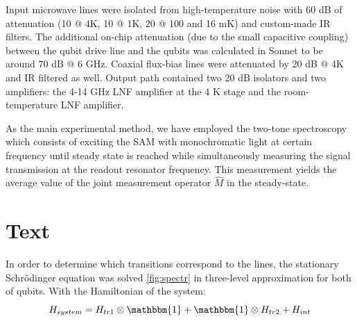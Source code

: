\documentclass[%
 aip,
 amsmath,amssymb,
 reprint,%
]{revtex4-1}
\begin{document}
Input microwave lines were isolated from high-temperature noise with 60 dB of attenuation (10 @ 4K, 10 @ 1K, 20 @ 100 and 16 mK) and custom-made IR filters. The additional on-chip attenuation (due to the small capacitive coupling) between the qubit drive line and the qubits was calculated in Sonnet to be around 70 dB @ 6 GHz. Coaxial flux-bias lines were attenuated by 20 dB @ 4K and IR filtered as well. Output path contained two 20 dB isolators and two amplifiers: the 4-14 GHz LNF amplifier at the 4 K stage and the room-temperature LNF amplifier.

As the main experimental method, we have employed the two-tone spectroscopy which consists of exciting the SAM with monochromatic light at certain frequency until steady state is reached while simultaneously measuring the signal transmission at the readout resonator frequency. This measurement yields the average value of the joint measurement operator $\hat M$ in the steady-state.

\section{Text}

In order to determine which transitions correspond to the lines, the stationary Schrödinger equation was solved \autoref{fig:spectr} in three-level approximation for both of qubits. With the Hamiltonian of the system:
\begin{equation}
	H_{system} = H_{tr1}\otimes \mathbbm{1}+\mathbbm{1}\otimes H_{tr2}+H_{int}
\end{equation}



\end{document}
